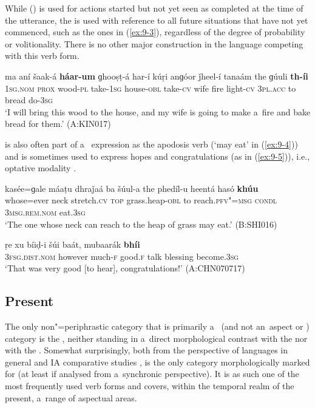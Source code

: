 \largerpage
While  () is used for actions started but not yet seen as completed at the time of the utterance, the  is used with reference to all future situations that have not yet commenced, such as the ones in (\ref{ex:9-3}), regardless of the degree of probability or volitionality. There is no other major construction in the language competing with this verb form.

\ea
\label{ex:9-3}
\gll ma aní šaak-á \textbf{háar-um} ɡhooṣṭ-á har-í kúṛi anɡóor ǰheel-í tanaám the ɡúuli \textbf{th-íi}\\
\textsc{1sg.nom} \textsc{prox} wood-\textsc{pl} take-\textsc{1sg} house-\textsc{obl} take-\textsc{cv} wife fire light-\textsc{cv} \textsc{3pl.acc} to bread do-\textsc{3sg}\\
\glt `I will bring this wood to the house, and my wife is going to make a~fire and bake bread for
them.' (A:KIN017)
\z

 is also often part of a~ expression as the apodosis verb (`may eat' in (\ref{ex:9-4})) and is sometimes used to express hopes and congratulations (as in (\ref{ex:9-5})), i.e., optative modality \citep[179]{bybeeetal1994}.

\ea
\label{ex:9-4}
\gll kasée=ɡale máaṭu dhraǰaá ba šúul-a the phedíl-u heentá hasó \textbf{khúu} \\
whose=ever neck stretch.\textsc{cv} \textsc{top} grass.heap-\textsc{obl}  to reach.\textsc{pfv"=msg } \textsc{condl} \textsc{3msg.rem.nom} eat.\textsc{3sg} \\
\glt `The one whose neck can reach to the heap of grass may eat.' (B:SHI016)

\ex
\label{ex:9-5}
\gll ṛe xu bíiḍ-i šúi baát, mubaarák \textbf{bhíi} \\
\textsc{3fsg.dist.nom} however much-\textsc{f} good.\textsc{f} talk blessing  become.\textsc{3sg} \\
\glt `That was very good [to hear], congratulations!' (A:CHN070717)
\z

\subsection{Present}
\label{subsec:9-1-3}

The only non"=periphrastic category that is primarily a~ (and not an~aspect or ) category is the , neither standing in a~direct morphological contrast with the  nor with the . Somewhat surprisingly, both from the perspective of languages in general \citep[103--128]{dahl1985} and IA comparative studies \citep[282, 288--289]{masica1991},  is the only category morphologically marked for  (at least if analysed from a~synchronic perspective). It is as such one of the most frequently used verb forms and covers, within the temporal realm of the present, a~range of aspectual areas. 



